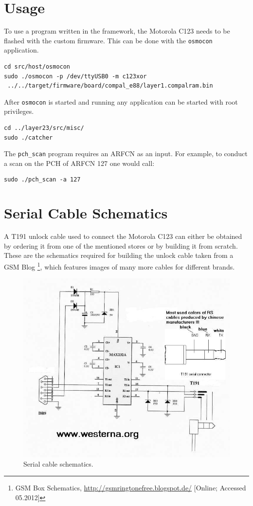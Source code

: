 \section{Usage}
\label{sec:osmo_usage}
To use a program written in the framework, the Motorola C123 needs to be flashed with the custom firmware.
This can be done with the \texttt{osmocon} application. 
\begin{verbatim}
cd src/host/osmocon
sudo ./osmocon -p /dev/ttyUSB0 -m c123xor
 ../../target/firmware/board/compal_e88/layer1.compalram.bin
\end{verbatim}
After \texttt{osmocon} is started and running any application can be started with root privileges.
\begin{verbatim}
cd ../layer23/src/misc/
sudo ./catcher
\end{verbatim}
The \texttt{pch\_scan} program requires an ARFCN as an input.
For example, to conduct a scan on the PCH of ARFCN 127 one would call:
\begin{verbatim}
sudo ./pch_scan -a 127
\end{verbatim}
\newpage

\section{Serial Cable Schematics}
\label{sec:osmo_serial_schematics}
A T191 unlock cable used to connect the Motorola C123 can either be obtained by ordering it from one of the mentioned stores or by building it from scratch.
These are the schematics required for building the unlock cable taken from a GSM Blog \footnote{GSM Box Schematics, \url{http://gsmringtonefree.blogspot.de/} [Online; Accessed 05.2012]}, which features images of many more cables for different brands.
\vfill
\begin{figure}[h!]
\includegraphics[width=.9\textwidth]{../Images/t191cable}
\caption{Serial cable schematics.}
\end{figure}
\vfill

